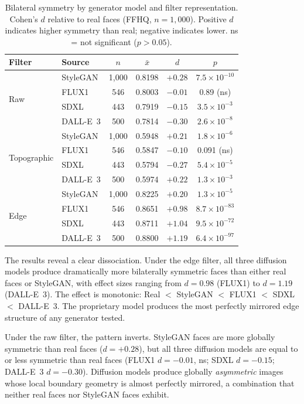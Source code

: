 \documentclass[11pt,a4paper]{article}
\begin{document}
\begin{table}[H]
\centering
\caption{Bilateral symmetry by generator model and filter representation.
Cohen's $d$ relative to real faces (FFHQ, $n = 1{,}000$). Positive $d$
indicates higher symmetry than real; negative indicates lower.
ns = not significant ($p > 0.05$).}
\label{tab:permodel_full}
\small
\begin{tabular}{llcccc}
\toprule
Filter & Source & $n$ & $\bar{x}$ & $d$ & $p$ \\
\midrule
\multirow{4}{*}{Raw}
& StyleGAN  & 1,000 & 0.8198 & $+0.28$ & $7.5\times10^{-10}$ \\
& FLUX1     &   546 & 0.8003 & $-0.01$ & 0.89 (ns) \\
& SDXL      &   443 & 0.7919 & $-0.15$ & $3.5\times10^{-3}$ \\
& DALL-E~3  &   500 & 0.7814 & $-0.30$ & $2.6\times10^{-8}$ \\
\midrule
\multirow{4}{*}{Topographic}
& StyleGAN  & 1,000 & 0.5948 & $+0.21$ & $1.8\times10^{-6}$ \\
& FLUX1     &   546 & 0.5847 & $-0.10$ & 0.091 (ns) \\
& SDXL      &   443 & 0.5794 & $-0.27$ & $5.4\times10^{-5}$ \\
& DALL-E~3  &   500 & 0.5974 & $+0.22$ & $1.3\times10^{-3}$ \\
\midrule
\multirow{4}{*}{Edge}
& StyleGAN  & 1,000 & 0.8225 & $+0.20$ & $1.3\times10^{-5}$ \\
& FLUX1     &   546 & 0.8651 & $+0.98$ & $8.7\times10^{-83}$ \\
& SDXL      &   443 & 0.8711 & $+1.04$ & $9.5\times10^{-72}$ \\
& DALL-E~3  &   500 & 0.8800 & $+1.19$ & $6.4\times10^{-97}$ \\
\bottomrule
\end{tabular}
\end{table}

The results reveal a clear dissociation. Under the edge filter, all three
diffusion models produce dramatically more bilaterally symmetric faces than
either real faces or StyleGAN, with effect sizes ranging from $d = 0.98$
(FLUX1) to $d = 1.19$ (DALL-E~3). The effect is monotonic: Real $<$ StyleGAN
$<$ FLUX1 $<$ SDXL $<$ DALL-E~3. The proprietary model produces the most
perfectly mirrored edge structure of any generator tested.

Under the raw filter, the pattern inverts. StyleGAN faces are more globally
symmetric than real faces ($d = +0.28$), but all three diffusion models are
equal to or less symmetric than real faces (FLUX1 $d = -0.01$, ns; SDXL
$d = -0.15$; DALL-E~3 $d = -0.30$). Diffusion models produce globally
\emph{asymmetric} images whose local boundary geometry is almost perfectly
mirrored, a combination that neither real faces nor StyleGAN faces exhibit.
\end{document}
